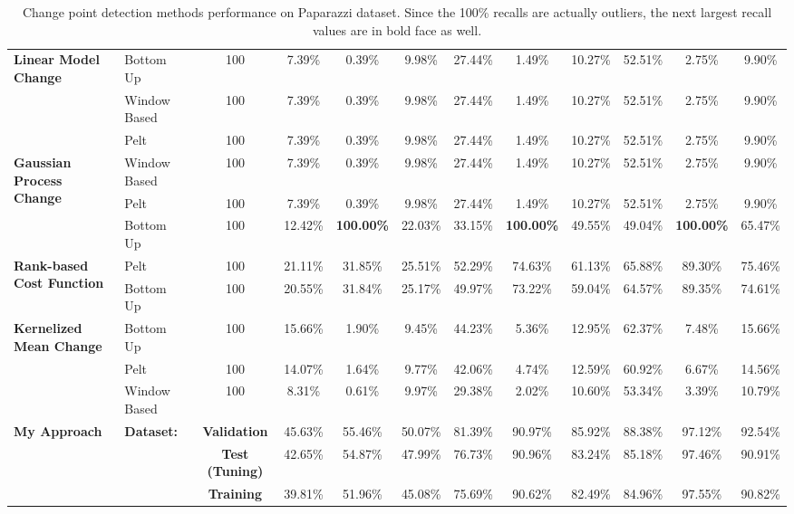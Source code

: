 \begin{table}
{\begin{tabular}{llcccccccccc}
\multirow{3}{*}{\textbf{Linear Model Change}}
    & Bottom Up & 100  &        7.39\% &     0.39\% &  9.98\% &        27.44\% &      1.49\% & 10.27\% &        52.51\% &      2.75\% &  9.90\% \\
    & Window Based & 100  &        7.39\% &     0.39\% &  9.98\% &        27.44\% &      1.49\% & 10.27\% &        52.51\% &      2.75\% &  9.90\% \\
    & Pelt & 100  &        7.39\% &     0.39\% &  9.98\% &        27.44\% &      1.49\% & 10.27\% &        52.51\% &      2.75\% &  9.90\% \\ \midrule
\multirow{3}{*}{\textbf{Gaussian Process Change}}
    & Window Based & 100  &        7.39\% &     0.39\% &  9.98\% &        27.44\% &      1.49\% & 10.27\% &        52.51\% &      2.75\% &  9.90\% \\
    & Pelt & 100  &        7.39\% &     0.39\% &  9.98\% &        27.44\% &      1.49\% & 10.27\% &        52.51\% &      2.75\% &  9.90\% \\
    & Bottom Up & 100  &       12.42\% &   \textbf{100.00\%} & 22.03\% &        33.15\% &    \textbf{100.00\%} & 49.55\% &        49.04\% &    \textbf{100.00\%} & 65.47\% \\ \midrule
\multirow{2}{*}{\textbf{Rank-based Cost Function}}
    & Pelt & 100  &       21.11\% &    31.85\% & 25.51\% &        52.29\% &     74.63\% & 61.13\% &        65.88\% &     89.30\% & 75.46\% \\
    & Bottom Up & 100  &       20.55\% &    31.84\% & 25.17\% &        49.97\% &     73.22\% & 59.04\% &        64.57\% &     89.35\% & 74.61\% \\ \midrule
\multirow{3}{*}{\textbf{Kernelized Mean Change}} 
    & Bottom Up & 100  &       15.66\% &     1.90\% &  9.45\% &        44.23\% &      5.36\% & 12.95\% &        62.37\% &      7.48\% & 15.66\% \\
    & Pelt & 100  &       14.07\% &     1.64\% &  9.77\% &        42.06\% &      4.74\% & 12.59\% &        60.92\% &      6.67\% & 14.56\% \\
    & Window Based & 100  &        8.31\% &     0.61\% &  9.97\% &        29.38\% &      2.02\% & 10.60\% &        53.34\% &      3.39\% & 10.79\% \\ \midrule \midrule
\multirow{3}{*}{\textbf{My Approach}} 
    & \multirow{3}{*}{\textbf{Dataset:}}  
         & \textbf{Validation} &  45.63\% &    55.46\% & 50.07\% &   81.39\% &     90.97\% & 85.92\% &   88.38\% &     97.12\% & 92.54\%  \\
    & {} & \textbf{Test (Tuning)} &  42.65\% &    54.87\% & 47.99\% &   76.73\% &     90.96\% & 83.24\% &   85.18\% &     97.46\% & 90.91\%  \\
    & {} & \textbf{Training}  &  39.81\% &    51.96\% & 45.08\% &   75.69\% &     90.62\% & 82.49\% &   84.96\% &     97.55\% & 90.82\%  \\
\bottomrule
\end{tabular}%
}
    \caption{Change point detection methods performance on Paparazzi dataset. Since the 100\% recalls are actually outliers, the next largest recall values are in bold face as well.}
    \label{tab:cpd_paparazzi}
\end{table}


